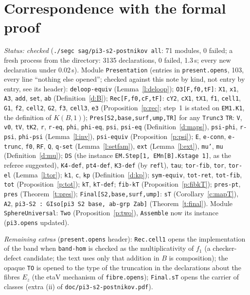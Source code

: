 \documentclass[11pt]{amsart}
\theoremstyle{definition}
\theoremstyle{remark}
\newcommand{\code}[1]{\texttt{#1}}
\begin{document}
\section{Correspondence with the formal proof}
\emph{Status: checked} (\code{./segc sag/pi3-s2-postnikov all}: 71 modules,
0 failed; a fresh process from the directory: 3135 declarations, 0 failed,
1.3\,s; every new declaration under 0.02\,s). Module \code{Presentation}
(entries in \code{present.opens}, 103, every line ``nothing else opened'';
checked against this note by kind, not entry by entry, see its header):
\code{deloop-equiv} (Lemma~\ref{l:deloop}); \code{O3[F,f0,tF]}: \code{X1},
\code{x1}, \code{A3}, \code{add}, \code{set}, \code{ab}
(Definition~\ref{d:B}); \code{Rec[F,f0,cF,tF]}: \code{cY2}, \code{cX1},
\code{tX1}, \code{f1}, \code{cell1}, \code{G1}, \code{f2}, \code{cell2},
\code{G2}, \code{f3}, \code{cell3}, \code{e3} (Proposition~\ref{p:rec};
step~1 is stated on \code{EM1.K1}, the definition of $K(B,1)$);
\code{Pres[S2,base,surf,ump,TR]} for any \code{Trunc3} \code{TR}: \code{V},
\code{v0}, \code{tV}, \code{tK2}, \code{r}, \code{r-eq}, \code{phi},
\code{phi-eq}, \code{psi}, \code{psi-eq} (Definition~\ref{d:maps}),
\code{psi-phi}, \code{r-psi}, \code{phi-psi} (Lemma~\ref{l:inv}),
\code{psi-equiv} (Proposition~\ref{p:psi}); \code{E}, \code{e-conn},
\code{e-trunc}, \code{f0}, \code{RF}, \code{Q}, \code{q-set}
(Lemma~\ref{l:setfam}), \code{ext} (Lemma~\ref{l:ext}), \code{mu'},
\code{mu} (Definition~\ref{d:mu}); \code{DS} (the instance
\code{EM.Step[1, EMn[B].Kstage 1]}, as the referee suggested),
\code{K4-def}, \code{pt4-def}, \code{K3-def} (by \code{refl}), \code{tau};
\code{tor-fib}, \code{tor}, \code{tor-el} (Lemma~\ref{l:tor}); \code{k1},
\code{c}, \code{kp} (Definition~\ref{d:kp}); \code{sym-equiv},
\code{tot-ret}, \code{tot-fib}, \code{tot} (Proposition~\ref{p:tot});
\code{kT}, \code{kT-def}; \code{fib-kT} (Proposition~\ref{p:fibkT});
\code{pres-pt}, \code{pres} (Theorem~\ref{t:pres});
\code{Final[S2,base,surf,ump]}: \code{sT} (Corollary~\ref{c:mapT}),
\code{A2}, \code{pi3-S2 : GIso[pi3 S2 base, ab-grp Zab]}
(Theorem~\ref{t:final}). Module \code{SphereUniversal}: \code{Two}
(Proposition~\ref{p:two}), \code{Assemble} now its instance
(\code{pi3.opens} updated).

\emph{Remaining extras} (\code{present.opens} header): \code{Rec.cell1}
opens the implementation of the band when \code{band-hom} is checked as
the multiplicativity of $f_1$ (a checker-defect candidate; the text uses
only that addition in $B$ is composition); the opaque \code{TO} is opened
to the type of the truncation in the declarations about the fibres $E_z$
(the etaV mechanism of \code{fibre.opens}); \code{Final.sT} opens the
carrier of classes (extra (ii) of \code{doc/pi3-s2-postnikov.pdf}).
\end{document}
